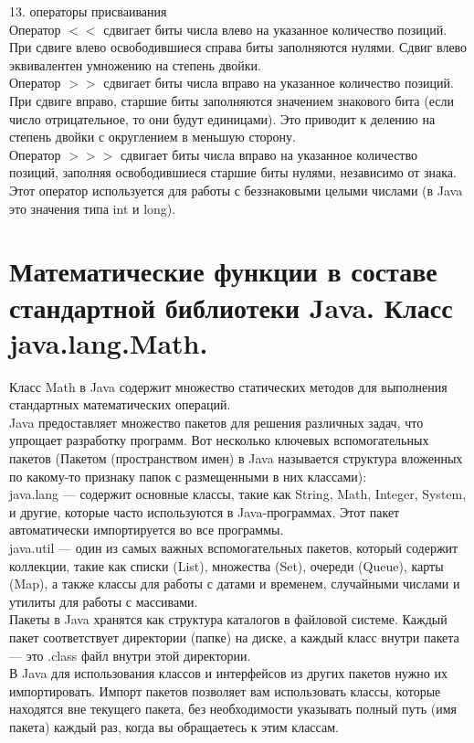 13.	операторы присваивания \\
Оператор $<<$ сдвигает биты числа влево на указанное количество позиций. При сдвиге влево освободившиеся справа биты заполняются нулями. Сдвиг влево эквивалентен умножению на степень двойки. \\
Оператор $>>$ сдвигает биты числа вправо на указанное количество позиций. При сдвиге вправо, старшие биты заполняются значением знакового бита (если число отрицательное, то они будут единицами). Это приводит к делению на степень двойки с округлением в меньшую сторону. \\
Оператор $>>>$ сдвигает биты числа вправо на указанное количество позиций, заполняя освободившиеся старшие биты нулями, независимо от знака. Этот оператор используется для работы с беззнаковыми целыми числами (в Java это значения типа int и long). 
\section{Математические функции в составе стандартной библиотеки Java. Класс java.lang.Math.}
Класс Math в Java содержит множество статических методов для выполнения стандартных математических операций. \\
Java предоставляет множество пакетов для решения различных задач, что упрощает разработку программ. Вот несколько ключевых вспомогательных пакетов (Пакетом (пространством имен) в Java называется структура вложенных по какому-то признаку папок с размещенными в них классами):\\
java.lang — содержит основные классы, такие как String, Math, Integer, System, и другие, которые часто используются в Java-программах. Этот пакет автоматически импортируется во все программы. \\
java.util — один из самых важных вспомогательных пакетов, который содержит коллекции, такие как списки (List), множества (Set), очереди (Queue), карты (Map), а также классы для работы с датами и временем, случайными числами и утилиты для работы с массивами. \\
Пакеты в Java хранятся как структура каталогов в файловой системе. Каждый пакет соответствует директории (папке) на диске, а каждый класс внутри пакета — это .class файл внутри этой директории. \\
В Java для использования классов и интерфейсов из других пакетов нужно их импортировать. Импорт пакетов позволяет вам использовать классы, которые находятся вне текущего пакета, без необходимости указывать полный путь (имя пакета) каждый раз, когда вы обращаетесь к этим классам. \\
